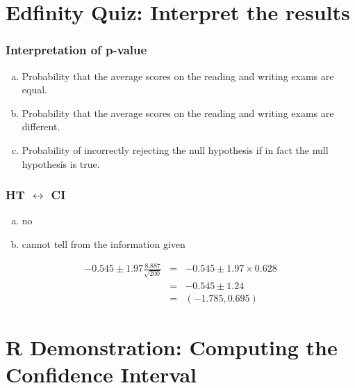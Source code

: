 \documentclass[slidestop,compress,mathserif]{beamer}
\newcommand{\soln}[1]{\textit{#1}}
\begin{document}

\section{Edfinity Quiz: Interpret the results}  %


\begin{frame}
\frametitle{Interpretation of p-value}


\begin{enumerate}[(a)]
\item Probability that the average scores on the reading and writing exams are equal.
\item Probability that the average scores on the reading and writing exams are different.
\item Probability of incorrectly rejecting the null hypothesis if in fact the null hypothesis is true.
\end{enumerate}

\end{frame}


\begin{frame}
\frametitle{HT $\leftrightarrow$ CI}


\begin{enumerate}[(a)]
\item no
\item cannot tell from the information given
\end{enumerate}

\soln{\pause
\begin{eqnarray*} 
-0.545 \pm 1.97 \frac{8.887}{\sqrt{200}} &=& -0.545 \pm 1.97 \times 0.628 \\
&=& -0.545 \pm 1.24 \\
&=& (-1.785, 0.695)
\end{eqnarray*}
}

\end{frame}


\section{R Demonstration: Computing the Confidence Interval} 


\end{document}
